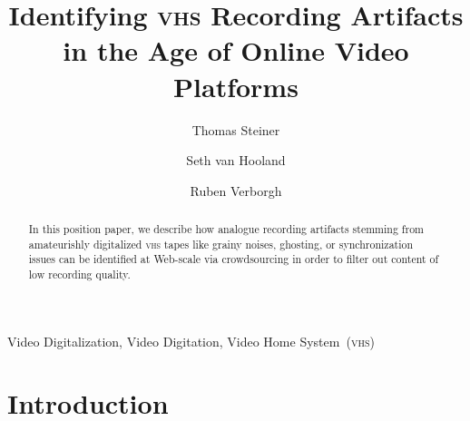 \documentclass[runningheads,a4paper]{llncs}
\newcommand{\keywords}[1]{\par\addvspace\baselineskip
\noindent\keywordname\enspace\ignorespaces#1}
\begin{document}
\mainmatter

\title{Identifying {\scshape vhs} Recording Artifacts\\
in the Age of Online Video Platforms}


\author{Thomas Steiner \and
        Seth van Hooland \and
        Ruben Verborgh}


\maketitle

\setcounter{footnote}{0}

\begin{abstract}
In this position paper, we describe how analogue recording artifacts
stemming from amateurishly digitalized {\scshape vhs} tapes like
grainy noises, ghosting, or synchronization issues
can be identified at Web-scale via crowdsourcing
in order to filter out content of low recording quality.
\end{abstract}

\keywords{Video Digitalization, Video Digitation, Video Home System~({\scshape vhs})}

\section{Introduction}
\end{document}
